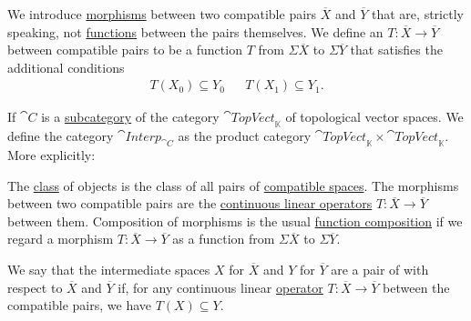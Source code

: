 \begin{definition}
\begin{thmenum}
     We introduce \hyperref[def:category/morphisms]{morphisms} between two compatible pairs \( \overline{X} \) and \( \overline{Y} \) that are, strictly speaking, not \hyperref[def:function]{functions} between the pairs themselves. We define an  \( T: \overline{X} \to \overline{Y} \) between compatible pairs to be a function \( T \) from \( \Sigma \overline{X} \) to \( \Sigma \overline{Y} \) that satisfies the additional conditions
    \begin{align*}
      T(X_0) \subseteq Y_0
      &&
      T(X_1) \subseteq Y_1.
    \end{align*}

     If \( \cat{C} \) is a \hyperref[def:subcategory]{subcategory} of the category \hyperref[def:category_of_topological_vector_spaces]{\( \cat{TopVect}_{\BbbK} \)} of topological vector spaces. We define the category \( \cat{Interp}_{\cat{C}} \) as the product category \( \cat{TopVect}_{\BbbK} \times \cat{TopVect}_{\BbbK} \). More explicitly:
    \begin{refenum}
       The \hyperref[def:set]{class} of objects is the class of all pairs of \hyperref[def:interpolated_topological_vector_space/compatibility]{compatible spaces}.
       The morphisms between two compatible pairs are the \hyperref[def:interpolated_topological_vector_space/morphisms]{continuous linear operators} \( T: \overline{X} \to \overline{Y} \) between them.
       Composition of morphisms is the usual \hyperref[def:multi_valued_function/composition]{function composition} if we regard a morphism \( T: \overline{X} \to \overline{Y} \) as a function from \( \Sigma \overline{X} \) to \( \Sigma \overline{Y} \).
    \end{refenum}

     We say that the intermediate spaces \( X \) for \( \overline{X} \) and \( Y \) for \( \overline{Y} \) are a pair of  with respect to \( \overline{X} \) and \( \overline{Y} \) if, for any continuous linear \hyperref[def:interpolated_topological_vector_space/morphisms]{operator} \( T: \overline{X} \to \overline{Y} \) between the compatible pairs, we have \( T(X) \subseteq Y \).
  \end{thmenum}
\end{definition}


